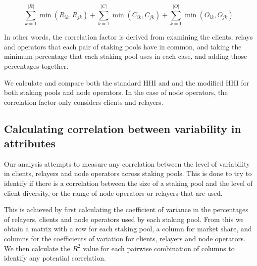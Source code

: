 \documentclass[conference]{IEEEtran}
\begin{document}
\[
\sum_{k=1}^{|R|} \min(R_{ik}, R_{jk}) + \sum_{k=1}^{|C|} \min(C_{ik}, C_{jk}) + \sum_{k=1}^{|O|} \min(O_{ik}, O_{jk})
\]

\vspace{8pt}

In other words, the correlation factor is derived from examining the clients, relays and operators that each pair of staking pools have in common, and taking the minimum percentage that each staking pool uses in each case, and adding those percentages together.

We calculate and compare both the standard HHI and and the modified HHI for both staking pools and node operators.  In the case of node operators, the correlation factor only considers clients and relayers.

\subsection{Calculating correlation between variability in attributes}
\label{sec:correlation-between-variability-in-attributes}

Our analysis attempts to measure any correlation between the level of variability in clients, relayers and node operators across staking pools. This is done to try to identify if there is a correlation between the size of a staking pool and the level of client diversity, or the range of node operators or relayers that are used.

This is achieved by first calculating the coefficient of variance in the percentages of relayers, clients and node operators used by each staking pool. From this we obtain a matrix with a row for each staking pool, a column for market share, and columns for the coefficients of variation for clients, relayers and node operators.  We then calculate the $R^2$ value for each pairwise combination of columns to identify any potential correlation.
\end{document}
